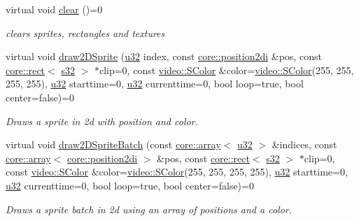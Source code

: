 \begin{DoxyCompactItemize}
virtual void \hyperlink{classirr_1_1gui_1_1IGUISpriteBank_a2305053e90c03ff274b637be23a5dd2a}{clear} ()=0
\begin{DoxyCompactList}\small\item\em clears sprites, rectangles and textures \end{DoxyCompactList}\item 
\mbox{\label{classirr_1_1gui_1_1IGUISpriteBank_aec335112ba4347aa50c5082e26fe2e9a}} 
virtual void \hyperlink{classirr_1_1gui_1_1IGUISpriteBank_aec335112ba4347aa50c5082e26fe2e9a}{draw2\+D\+Sprite} (\hyperlink{namespaceirr_a0416a53257075833e7002efd0a18e804}{u32} index, const \hyperlink{namespaceirr_1_1core_a3643c2cc7820dd78cd87e73a46b92145}{core\+::position2di} \&pos, const \hyperlink{classirr_1_1core_1_1rect}{core\+::rect}$<$ \hyperlink{namespaceirr_ac66849b7a6ed16e30ebede579f9b47c6}{s32} $>$ $\ast$clip=0, const \hyperlink{classirr_1_1video_1_1SColor}{video\+::\+S\+Color} \&color=\hyperlink{classirr_1_1video_1_1SColor}{video\+::\+S\+Color}(255, 255, 255, 255), \hyperlink{namespaceirr_a0416a53257075833e7002efd0a18e804}{u32} starttime=0, \hyperlink{namespaceirr_a0416a53257075833e7002efd0a18e804}{u32} currenttime=0, bool loop=true, bool center=false)=0
\begin{DoxyCompactList}\small\item\em Draws a sprite in 2d with position and color. \end{DoxyCompactList}\item 
\mbox{\label{classirr_1_1gui_1_1IGUISpriteBank_adbfa01705a000248ea92149ad5e975d4}} 
virtual void \hyperlink{classirr_1_1gui_1_1IGUISpriteBank_adbfa01705a000248ea92149ad5e975d4}{draw2\+D\+Sprite\+Batch} (const \hyperlink{classirr_1_1core_1_1array}{core\+::array}$<$ \hyperlink{namespaceirr_a0416a53257075833e7002efd0a18e804}{u32} $>$ \&indices, const \hyperlink{classirr_1_1core_1_1array}{core\+::array}$<$ \hyperlink{namespaceirr_1_1core_a3643c2cc7820dd78cd87e73a46b92145}{core\+::position2di} $>$ \&pos, const \hyperlink{classirr_1_1core_1_1rect}{core\+::rect}$<$ \hyperlink{namespaceirr_ac66849b7a6ed16e30ebede579f9b47c6}{s32} $>$ $\ast$clip=0, const \hyperlink{classirr_1_1video_1_1SColor}{video\+::\+S\+Color} \&color=\hyperlink{classirr_1_1video_1_1SColor}{video\+::\+S\+Color}(255, 255, 255, 255), \hyperlink{namespaceirr_a0416a53257075833e7002efd0a18e804}{u32} starttime=0, \hyperlink{namespaceirr_a0416a53257075833e7002efd0a18e804}{u32} currenttime=0, bool loop=true, bool center=false)=0
\begin{DoxyCompactList}\small\item\em Draws a sprite batch in 2d using an array of positions and a color. \end{DoxyCompactList}\end{DoxyCompactItemize}
